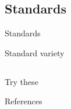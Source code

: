 \documentclass{beamer}
\newcommand{\subtwosix}{Standards}
\begin{document}
    \subsection{\subtwosix}
      \begin{frame}{\subtwosix}
        \begin{alertblock}{Standard variety}
          
        \end{alertblock}
      \end{frame}


    \subsection{}
      \begin{frame}{}
        \begin{block}{Try these}
        \end{block}
      \end{frame}

      \begin{frame}{References}
      \end{frame}
\end{document}
